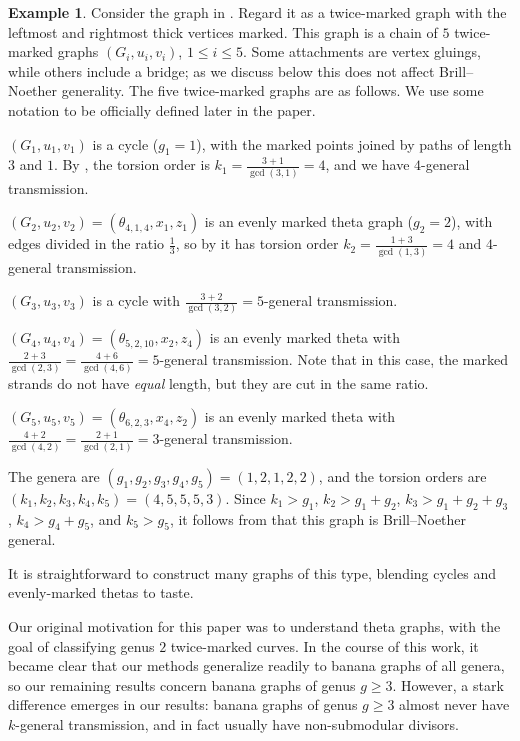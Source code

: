 \documentclass[11pt]{article}
\theoremstyle{definition}
\newtheorem{example}[theo]{Example}
\numberwithin{equation}{section}
\begin{document}
\begin{example}
\label{eg:bng}
    Consider the graph in . Regard it as a twice-marked graph with the leftmost and rightmost thick vertices marked. This graph is a chain of $5$ twice-marked graphs $(G_i, u_i, v_i)$, $1 \leq i \leq 5$. Some attachments are vertex gluings, while others include a bridge; as we discuss below this does not affect Brill--Noether generality. The five twice-marked graphs are as follows. We use some notation to be officially defined later in the paper.
    
    $(G_1,u_1,v_1)$ is a cycle ($g_1 = 1$), with the marked points joined by paths of length $3$ and $1$. By , the torsion order is $k_1 = \frac{3+1}{\gcd(3,1)} = 4$, and we have $4$-general transmission.
    
    $(G_2,u_2,v_2) = (\theta_{4,1,4}, x_1, z_1)$ is an evenly marked theta graph ($g_2 = 2$), with edges divided in the ratio $\frac{1}{3}$, so by  it has torsion order $k_2 = \frac{1+3}{\gcd(1,3)} = 4$ and $4$-general transmission.
    
    $(G_3, u_3, v_3)$ is a cycle  with $\frac{3+2}{\gcd(3,2)} = 5$-general transmission.
    
    $(G_4,u_4,v_4) = (\theta_{5,2,10}, x_2, z_4)$ is an evenly marked theta with $\frac{2+3}{\gcd(2,3)} = \frac{4+6}{\gcd(4,6)} = 5$-general transmission. Note that in this case, the marked strands do not have \emph{equal} length, but they are cut in the same ratio.
    
    $(G_5, u_5, v_5) = (\theta_{6,2,3}, x_4, z_2)$ is an evenly marked theta with $\frac{4+2}{\gcd(4,2)} = \frac{2+1}{\gcd(2,1)} = 3$-general transmission.
    
    The genera are $(g_1, g_2, g_3,g_4,g_5) = (1,2,1,2,2)$, and the torsion orders are $(k_1, k_2, k_3, k_4, k_5) = (4,5,5,5,3)$. Since $k_1 > g_1$, $k_2 > g_1+g_2$, $k_3 > g_1+g_2+g_3$, $k_4 > g_4 + g_5$, and $k_5 > g_5$, it follows from  that this graph is Brill--Noether general.
    
    It is straightforward to construct many graphs of this type, blending cycles and evenly-marked thetas to taste.
\end{example}

Our original motivation for this paper was to understand theta graphs, with the goal of classifying genus $2$ twice-marked curves. In the course of this work, it became clear that our methods generalize readily to banana graphs of all genera, so our remaining results concern banana graphs of genus $g \geq 3$. However, a stark difference emerges in our results: banana graphs of genus $g \geq 3$ almost never have $k$-general transmission, and in fact usually have non-submodular divisors. 
\end{document}
